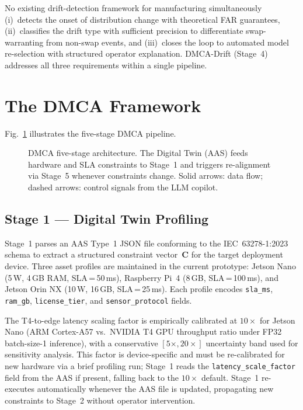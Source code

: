 \documentclass[12pt,a4paper]{article}
\begin{document}
No existing drift-detection framework for manufacturing
simultaneously (i)~detects the onset of distribution change with
theoretical FAR guarantees, (ii)~classifies the drift type with
sufficient precision to differentiate swap-warranting from
non-swap events, and (iii)~closes the loop to automated model
re-selection with structured operator explanation.
DMCA-Drift (Stage~4) addresses all three requirements within a
single pipeline.

\section{The DMCA Framework}
\label{sec:framework}

Fig.~\ref{fig:dmca-arch} illustrates the five-stage DMCA pipeline.

\begin{figure}[t]
  \centering
  \fbox{\rule{0pt}{6cm}\rule{0.95\textwidth}{0pt}}
  \caption{DMCA five-stage architecture. The Digital Twin (AAS) feeds
    hardware and SLA constraints to Stage~1 and triggers re-alignment
    via Stage~5 whenever constraints change. Solid arrows: data flow;
    dashed arrows: control signals from the LLM copilot.}
  \label{fig:dmca-arch}
\end{figure}

\subsection{Stage 1 — Digital Twin Profiling}
\label{subsec:s1}

Stage~1 parses an AAS Type~1 JSON file conforming to the
IEC~63278-1:2023 schema to extract a structured constraint
vector~$\mathbf{C}$ for the target deployment device.
Three asset profiles are maintained in the current prototype:
Jetson Nano (5\,W, 4\,GB RAM, SLA\,=\,50\,ms),
Raspberry Pi~4 (8\,GB, SLA\,=\,100\,ms), and
Jetson Orin NX (10\,W, 16\,GB, SLA\,=\,25\,ms).
Each profile encodes \texttt{sla\_ms}, \texttt{ram\_gb},
\texttt{license\_tier}, and \texttt{sensor\_protocol} fields.

The T4-to-edge latency scaling factor is empirically calibrated at
$10\times$ for Jetson Nano (ARM Cortex-A57 vs.\ NVIDIA T4 GPU
throughput ratio under FP32 batch-size-1 inference), with a
conservative $[5\times, 20\times]$ uncertainty band used for
sensitivity analysis.
This factor is device-specific and must be re-calibrated for new
hardware via a brief profiling run; Stage~1 reads the
\texttt{latency\_scale\_factor} field from the AAS if present,
falling back to the $10\times$ default.
Stage~1 re-executes automatically whenever the AAS file is updated,
propagating new constraints to Stage~2 without operator intervention.
\end{document}
